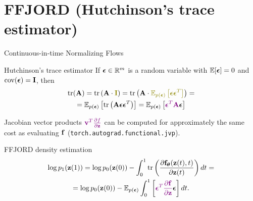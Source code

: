 \section{FFJORD (Hutchinson's trace estimator)}
\begin{frame}{Continuous-in-time Normalizing Flows}
	\begin{block}{Hutchinson's trace estimator}
		If $\boldsymbol{\epsilon} \in \mathbb{R}^m$ is a random variable with $\mathbb{E} [\boldsymbol{\epsilon}] = 0$ and $\text{cov} (\boldsymbol{\epsilon}) = \mathbf{I}$, then
		\vspace{-0.3cm}
		\begin{multline*}
		    \text{tr}(\mathbf{A}) = \text{tr}\left(\mathbf{A} \cdot {\color{olive}\bI} \right) = \text{tr}\left(\mathbf{A} \cdot {\color{olive}\mathbb{E}_{p(\bepsilon)} \left[ \bepsilon \bepsilon^T \right]} \right) = \\ 
		    =  \mathbb{E}_{p(\bepsilon)} \left[  \text{tr}\left(  \mathbf{A}  \bepsilon \bepsilon^T \right) \right] =  \mathbb{E}_{p(\bepsilon)} \left[ {\color{violet} \bepsilon^T \mathbf{A}} \bepsilon  \right]
		\end{multline*}
		\vspace{-0.6 cm}
	\end{block}
	Jacobian vector products ${\color{violet}\mathbf{v}^T \frac{\partial f}{\partial \mathbf{z}}}$ can be computed for approximately the same cost as evaluating $\mathbf{f}$ (\texttt{torch.autograd.functional.jvp}).
	\begin{block}{FFJORD density estimation}
		\vspace{-0.8cm}
		\begin{multline*}
		    \log p_1(\mathbf{z}(1)) = \log p_0(\mathbf{z}(0)) - \int_{0}^{1} \text{tr}  \left( \frac{\partial \mathbf{f}_{\boldsymbol{\theta}}(\mathbf{z}(t), t)}{\partial \mathbf{z}(t)} \right) dt = \\ = \log p_0(\mathbf{z}(0)) - \mathbb{E}_{p(\boldsymbol{\epsilon})} \int_{0}^{1} \left[ {\color{violet}\boldsymbol{\epsilon}^T \frac{\partial \mathbf{f}}{\partial \mathbf{z}}} \boldsymbol{\epsilon} \right] dt.
		\end{multline*}
	\end{block}
\end{frame}
